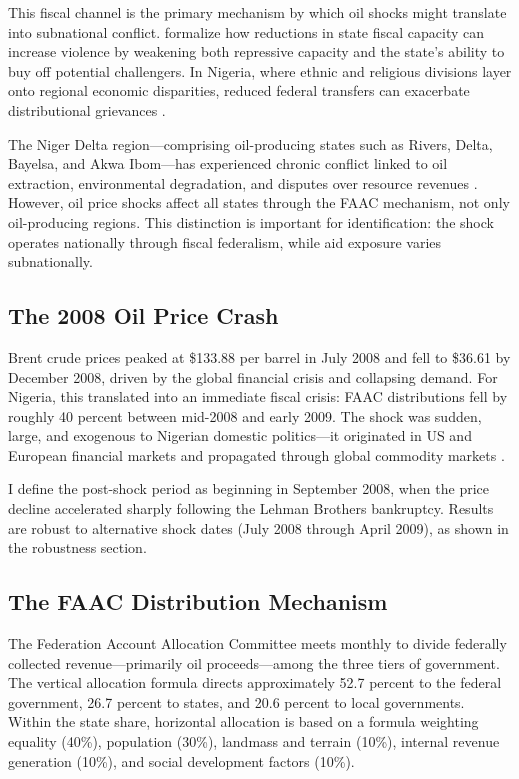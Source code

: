 \documentclass[12pt]{article}
\begin{document}
This fiscal channel is the primary mechanism by which oil shocks might translate into subnational conflict. \citet{besley2011pillars} formalize how reductions in state fiscal capacity can increase violence by weakening both repressive capacity and the state's ability to buy off potential challengers. In Nigeria, where ethnic and religious divisions layer onto regional economic disparities, reduced federal transfers can exacerbate distributional grievances \citep{fearon2003ethnicity}.

The Niger Delta region---comprising oil-producing states such as Rivers, Delta, Bayelsa, and Akwa Ibom---has experienced chronic conflict linked to oil extraction, environmental degradation, and disputes over resource revenues \citep{ross2004does}. However, oil price shocks affect all states through the FAAC mechanism, not only oil-producing regions. This distinction is important for identification: the shock operates nationally through fiscal federalism, while aid exposure varies subnationally.

\subsection{The 2008 Oil Price Crash}

Brent crude prices peaked at \$133.88 per barrel in July 2008 and fell to \$36.61 by December 2008, driven by the global financial crisis and collapsing demand. For Nigeria, this translated into an immediate fiscal crisis: FAAC distributions fell by roughly 40 percent between mid-2008 and early 2009. The shock was sudden, large, and exogenous to Nigerian domestic politics---it originated in US and European financial markets and propagated through global commodity markets \citep{deaton1999commodity}.

I define the post-shock period as beginning in September 2008, when the price decline accelerated sharply following the Lehman Brothers bankruptcy. Results are robust to alternative shock dates (July 2008 through April 2009), as shown in the robustness section.

\subsection{The FAAC Distribution Mechanism}

The Federation Account Allocation Committee meets monthly to divide federally collected revenue---primarily oil proceeds---among the three tiers of government. The vertical allocation formula directs approximately 52.7 percent to the federal government, 26.7 percent to states, and 20.6 percent to local governments. Within the state share, horizontal allocation is based on a formula weighting equality (40\%), population (30\%), landmass and terrain (10\%), internal revenue generation (10\%), and social development factors (10\%).
\end{document}
